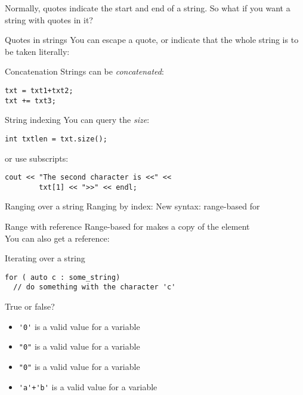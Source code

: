 Normally, quotes indicate the start and end of a string. So what if
you want a string with quotes in it?

\begin{block}{Quotes in strings}
  \label{sl:string-quote}
  You can escape a quote, or indicate that the whole string is to be
  taken literally:
\end{block}

\begin{block}{Concatenation}
  \label{sl:string-plus}
  Strings can be \emph{concatenated}:
\begin{verbatim}
txt = txt1+txt2;
txt += txt3;
\end{verbatim}
\end{block}

\begin{block}{String indexing}
  \label{sl:string-vector}
  You can query the \emph{size}:
\begin{verbatim}
int txtlen = txt.size();
\end{verbatim}
or use subscripts:
\begin{verbatim}
cout << "The second character is <<" << 
        txt[1] << ">>" << endl;
\end{verbatim}
\end{block}

\begin{block}{Ranging over a string}
  \label{sl:string-index}
  Ranging by index:
  New syntax: range-based for
\end{block}

\begin{block}{Range with reference}
  \label{sl:string-index-ref}
  Range-based for makes a copy of the element\\
  You can also get a reference:
\end{block}

\begin{block}{Iterating over a string}
\begin{verbatim}
for ( auto c : some_string)
  // do something with the character 'c'
\end{verbatim}
\end{block}

\begin{review}
  \label{q:string}
  True or false?
  \begin{itemize}
  \item \verb+'0'+ is a valid value for a  variable
  \item \verb+"0"+ is a valid value for a  variable
  \item \verb+"0"+ is a valid value for a  variable
  \item \verb/'a'+'b'/ is a valid value for a  variable
  \end{itemize}
\end{review}

